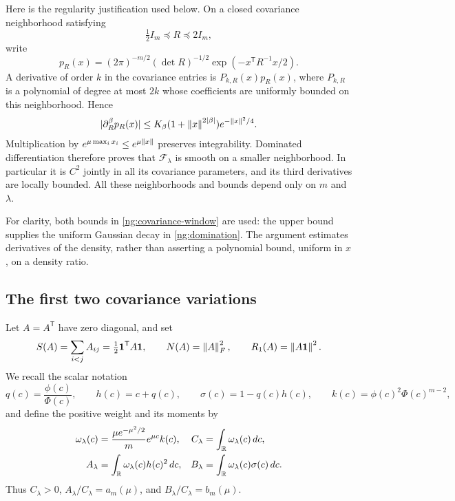 Here is the regularity justification used below. On a closed covariance
neighborhood satisfying
\begin{equation}\label{ng:covariance-window}
 \tfrac12 I_m\preceq R\preceq2I_m,
\end{equation}
write
\[
 p_R(x)=(2\pi)^{-m/2}(\det R)^{-1/2}
                  \exp(-x^{\mathsf T}R^{-1}x/2).
\]
A derivative of order $k$ in the covariance entries is
$P_{k,R}(x)p_R(x)$, where $P_{k,R}$ is a polynomial of degree at most $2k$
whose coefficients are uniformly bounded on this neighborhood. Hence
\begin{equation}\label{ng:domination}
 |\partial_R^\beta p_R(x)|
 \le K_\beta(1+\left\lVert x\right\rVert^{2|\beta|})e^{-\left\lVert x\right\rVert^2/4}.
\end{equation}
Multiplication by $e^{\mu\max_i x_i}\le e^{\mu\left\lVert x\right\rVert}$ preserves
integrability. Dominated differentiation therefore proves that
$\mathcal F_\lambda$ is smooth on a smaller neighborhood.
In particular it is $C^2$ jointly in all its covariance parameters, and
its third derivatives are locally bounded. All these neighborhoods and
bounds depend only on $m$ and $\lambda$.

For clarity, both bounds in \eqref{ng:covariance-window} are used:
the upper bound supplies the uniform Gaussian decay in
\eqref{ng:domination}. The argument estimates derivatives of the density,
rather than asserting a polynomial bound, uniform in $x$, on a density ratio.

\subsection{The first two covariance variations}\label{ng:variation}

Let $A=A^{\mathsf T}$ have zero diagonal, and set
\[
 S(A)=\sum_{i<j}A_{ij}=\tfrac12\mathbf 1^{\mathsf T}A\mathbf 1,
 \qquad N(A)=\left\lVert A\right\rVert_F^2,\qquad R_1(A)=\left\lVert A\mathbf 1\right\rVert^2.
\]
We recall the scalar notation
\[
 q(c)=\frac{\phi(c)}{\Phi(c)},\qquad h(c)=c+q(c),\qquad
 \sigma(c)=1-q(c)h(c),\qquad k(c)=\phi(c)^2\Phi(c)^{m-2},
\]
and define the positive weight and its moments by
\begin{align}
 \omega_\lambda(c)&=\frac{\mu e^{-\mu^2/2}}m e^{\mu c}k(c),
       & C_\lambda&=\int_{\mathbb R}\omega_\lambda(c)\,dc,\label{ng:weight}\\
 A_\lambda&=\int_{\mathbb R}\omega_\lambda(c)h(c)^2\,dc,
       & B_\lambda&=\int_{\mathbb R}\omega_\lambda(c)\sigma(c)\,dc.\nonumber
\end{align}
Thus $C_\lambda>0$, $A_\lambda/C_\lambda=a_m(\mu)$, and
$B_\lambda/C_\lambda=b_m(\mu)$.


